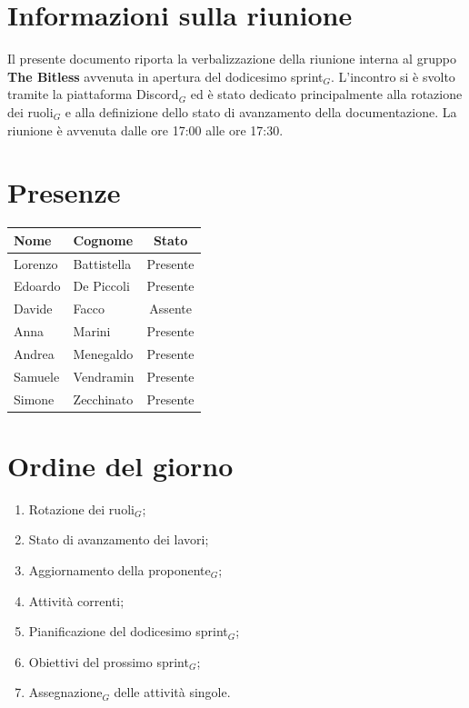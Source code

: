 \documentclass[a4paper, 10pt, colorlinks=true, linkcolor=black, urlcolor=blue, citecolor=blue, hidelinks]{article}
\begin{document}
\newcommand{\titolo}{Verbale interno}
\newcommand{\dataverbale}{2026-08-18}
\newcommand{\dataversione}{2026-08-18}
\newcommand{\versione}{1.0.0}
\newcommand{\stato}{Approvato}
\newcommand{\destinatari}{The Bitless, prof. Tullio Vardanega, prof. Riccardo Cardin}
\def\templatedir{../../../../templates}

\begin{titlepage}

\end{titlepage}

\newpage
\tableofcontents

\newpage
{}
\section{Informazioni sulla riunione}
Il presente documento riporta la verbalizzazione della riunione interna al gruppo \textbf{The Bitless} avvenuta in apertura del dodicesimo sprint$_G$. L'incontro si è svolto tramite la piattaforma Discord$_G$ ed è stato dedicato principalmente alla rotazione dei ruoli$_G$ e alla definizione dello stato di avanzamento della documentazione. La riunione è avvenuta dalle ore 17:00 alle ore 17:30.

\section{Presenze}
\begin{center}
\begin{tabular}{|l|l|c|}
\hline
\textbf{Nome} & \textbf{Cognome} & \textbf{Stato} \\
\hline
Lorenzo & Battistella & Presente \\
Edoardo & De Piccoli & Presente \\
Davide & Facco & Assente \\
Anna & Marini & Presente \\
Andrea & Menegaldo & Presente \\
Samuele & Vendramin & Presente \\
Simone & Zecchinato & Presente \\
\hline
\end{tabular}
\end{center}

\section{Ordine del giorno}
\begin{enumerate}
    \item Rotazione dei ruoli$_G$;
    \item Stato di avanzamento dei lavori;
    \item Aggiornamento della proponente$_G$;
    \item Attività correnti;
    \item Pianificazione del dodicesimo sprint$_G$;
    \item Obiettivi del prossimo sprint$_G$;
    \item Assegnazione$_G$ delle attività singole.
\end{enumerate}
\end{document}
